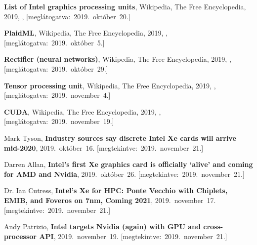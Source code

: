 \begin{thebibliography}{9}
	\textbf{List of Intel graphics processing units},
	{Wikipedia}{,} The Free Encyclopedia,
	2019,
	,
	\mbox{[meglátogatva:~2019.~október~20.]}

	\textbf{PlaidML},
	{Wikipedia}{,} The Free Encyclopedia,
	2019,
	,
	\mbox{[meglátogatva:~2019.~október~5.]}

	\textbf{Rectifier (neural networks)},
	{Wikipedia}{,} The Free Encyclopedia,
	2019,
	,
	\mbox{[meglátogatva:~2019.~október~29.]}

	\textbf{Tensor processing unit},
	{Wikipedia}{,} The Free Encyclopedia,
	2019,
	,
	\mbox{[meglátogatva:~2019.~november~4.]}

	\textbf{CUDA},
	{Wikipedia}{,} The Free Encyclopedia,
	2019,
	,
	\mbox{[meglátogatva:~2019.~november~19.]}

	Mark Tyson,
	\textbf{Industry sources say discrete Intel Xe cards will arrive mid-2020},
	2019.~október~16.
	[megtekintve:~2019.~november~21.]

	Darren Allan,
	\textbf{Intel’s first Xe graphics card is officially ‘alive’ and coming for AMD and Nvidia},
	2019.~október~26.
	[megtekintve:~2019.~november~21.]

	Dr. Ian Cutress,
	\textbf{Intel’s Xe for HPC: Ponte Vecchio with Chiplets, EMIB, and Foveros on 7nm, Coming 2021},
	2019.~november~17.
	[megtekintve:~2019.~november~21.]

	Andy Patrizio,
	\textbf{Intel targets Nvidia (again) with GPU and cross-processor API},
	2019.~november~19.
	[megtekintve:~2019.~november~21.]

\end{thebibliography}